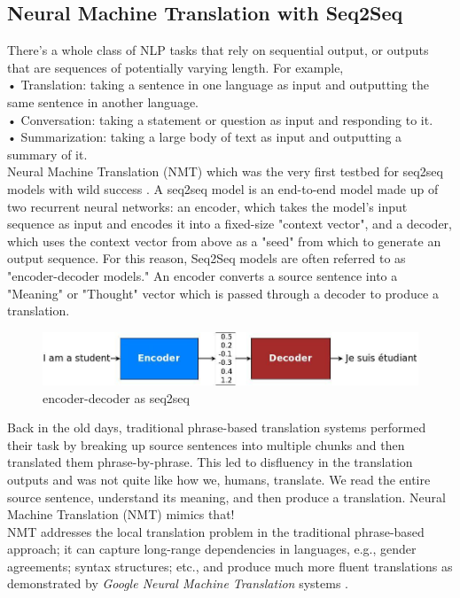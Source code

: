 \subsection{Neural Machine Translation with Seq2Seq} 
There’s a whole
class of NLP tasks that rely on sequential output, or outputs that are
sequences of potentially varying length. For example,\\
• Translation: taking a sentence in one language as input and outputting
the same sentence in another language.\\
• Conversation: taking a statement or question as input and responding
to it.\\
• Summarization: taking a large body of text as input and outputting
a summary of it.
\\Neural Machine Translation (NMT) which was the very first testbed for seq2seq models with wild success \cite{web016}. A seq2seq model is an end-to-end model made up of two recurrent neural networks: an encoder, which takes the model’s input sequence as input and
encodes it into a fixed-size "context vector", and a decoder, which uses the context vector from above as a "seed"
from which to generate an output sequence. For this reason, Seq2Seq models are often referred to as "encoder-decoder
models." An encoder converts a source sentence into a "Meaning" or "Thought" vector which is passed through a decoder to produce a translation.\\
  \begin{figure}[H]%
    \center%
    \includegraphics[width=\textwidth]{images/amir/encdec.jpg}%
    \caption[Encoder part of seq2seq]{encoder-decoder as seq2seq}\label{fig:encdec}%
  \end{figure}
  Back in the old days, traditional phrase-based translation systems performed their task by breaking up source sentences into multiple chunks and then translated them phrase-by-phrase. This led to disfluency in the translation outputs and was not quite like how we, humans, translate. We read the entire source sentence, understand its meaning, and then produce a translation. Neural Machine Translation (NMT) mimics that!\\
  NMT addresses the local translation problem in the traditional phrase-based approach; it can capture long-range dependencies in languages, e.g., gender agreements; syntax structures; etc., and produce much more fluent translations as demonstrated by \textit{Google Neural Machine Translation} systems \cite{web017}.\\
